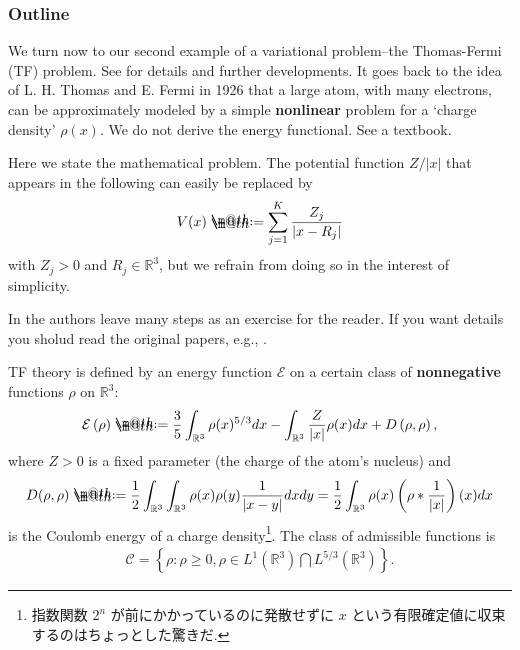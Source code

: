 \documentclass[openany, a4paper, oneside]{book}
\makeatletter
\newcommand*{\defeq}{\mathrel{\rlap{%
\raisebox{0.3ex}{$\m@th\cdot$}}%
\raisebox{-0.3ex}{$\m@th\cdot$}}%
=}
\theoremstyle{break}
\theoremstyle{breakdefn}
\newcommand{\abs}[1]{\left|#1\right|}
\newcommand{\rbk}[1]{\left (#1\right)}
\newcommand{\set}[2]{\left\{#1 : #2\right\}}
\newcommand{\bbRthree}{\mathbb{R}^3}
\newcommand{\calC}{\mathcal{C}}
\newcommand{\calE}{\mathcal{E}}
\makeatother
\begin{document}
\subsubsection{Outline}
\label{sec-7-10-3-1-1}

We turn now to our second example of a variational problem--the Thomas-Fermi (TF) problem.
See \cite{LiebSimon1} for details and further developments.
It goes back to the idea of L. H. Thomas and E. Fermi in 1926 that a large atom,
with many electrons, can be approximately modeled by a simple \textbf{nonlinear} problem for a
`charge density' $\rho (x)$.
We do not derive the energy functional.
See a textbook.

Here we state the mathematical problem.
The potential function $Z / \abs{x}$ that appears in the following can easily be replaced by
\begin{align}
 V (x)
 \defeq
 \sum_{j=1}^{K} \frac{Z_j}{\abs{x - R_j}}
\end{align}
with $Z_j > 0$ and $R_j \in \bbRthree$, but we refrain from doing so in the interest of simplicity.

In \cite{LiebLoss1} the authors leave many steps as an exercise for the reader.
If you want details you sholud read the original papers, e.g., \cite{LiebSimon1}.

TF theory is defined by an energy function $\calE$ on a certain class of \textbf{nonnegative} functions $\rho$ on $\bbRthree$:
\begin{align}
 \calE \rbk{\rho}
 \defeq
 \frac{3}{5} \int_{\bbRthree} \rho (x)^{5/3} dx - \int_{\bbRthree} \frac{Z}{\abs{x}} \rho (x) dx + D \rbk{\rho, \rho}, \label{Lieb-Loss_Analysis_chap11_17}
\end{align}
where $Z > 0$ is a fixed parameter (the charge of the atom's nucleus) and
\begin{align}
 D (\rho, \rho)
 \defeq
 \frac{1}{2} \int_{\bbRthree} \int_{\bbRthree} \rho (x) \rho (y) \frac{1}{\abs{x - y}} dx dy
 =
 \frac{1}{2} \int_{\bbRthree} \rho (x) \rbk{\rho * \frac{1}{\abs{x}}}(x) dx
\end{align}
is the Coulomb energy of a charge density\footnote{指数関数 $2^n$ が前にかかっているのに発散せずに $x$ という有限確定値に収束するのはちょっとした驚きだ.
 }.
The class of admissible functions is
\begin{align}
 \calC
 =
 \set{\rho}{\rho \geq 0, \rho \in L^1 \rbk{\bbRthree} \bigcap L^{5/3} \rbk{\bbRthree}}.
\end{align}
\end{document}
